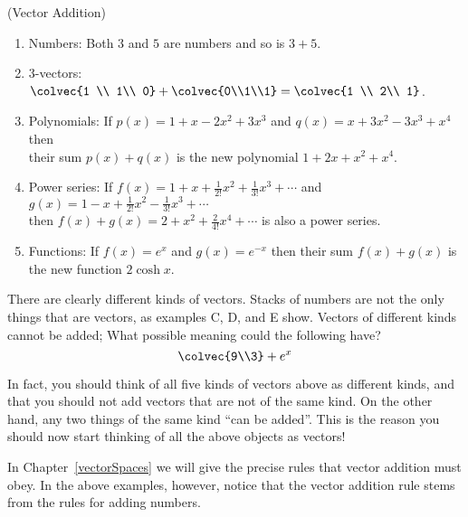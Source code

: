 \begin{example} (Vector Addition)
\begin{enumerate}\renewcommand{\theenumi}{(\Alph*{enumi})}
\item Numbers: Both $3$ and $5$ are numbers and so is $3+5$.\\[-2mm]
\item 3-vectors: $\colvec{1 \\ 1\\ 0} + \colvec{0\\1\\1}=\colvec{1 \\ 2\\ 1}$.\\[-1mm]
\item Polynomials: If $p(x)=1+x-2x^2+3x^3$ and $q(x)=x+3x^2-3x^3+x^4$ then\\[1mm] their sum $p(x)+q(x)$ is the new polynomial $1+2x+x^2+x^4$.\\
\item Power series: If $f(x)=1+x+\frac1{2!} x^2 + \frac1{3!} x^3 +\cdots$ and $g(x)=1-x+\frac1{2!} x^2 - \frac1{3!} x^3 +\cdots$ \\[1mm]
 then $f(x)+g(x)=2+ x^2 +\frac2 {4!} x^4+\cdots$ is also a power series.\\
\item Functions: If $f(x)=e^x$ and $g(x)=e^{-x}$ then their sum $f(x)+g(x)$ is the new function $2\cosh x$.
\end{enumerate}
\end{example}

\noindent
There are clearly different kinds of vectors. 
Stacks of numbers are not the only things that are vectors, as examples C, D, and E show. 
Vectors of different kinds cannot be added; What possible meaning could the following have? 
\[\colvec{9\\3} + e^x\]

In fact, you should think of all five kinds of vectors above as different kinds, and that you should not add vectors that are not of the same kind. 
On the other hand, any two things of the same kind ``can be added''. 
This is the reason you should now start thinking of all the above objects as vectors! 

In Chapter~\ref{vectorSpaces} we will give the precise rules that  vector addition must obey. 
In the above examples, however, notice that the vector addition rule stems from the rules for adding numbers. 
 

